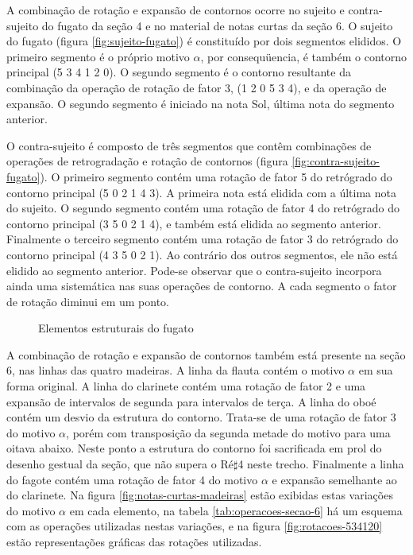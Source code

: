A combinação de rotação e expansão de contornos ocorre no sujeito e
contra-sujeito do fugato da seção 4 e no material de notas curtas da
seção 6. O sujeito do fugato (figura \ref{fig:sujeito-fugato}) é
constituído por dois segmentos elididos. O primeiro segmento é o
próprio motivo $\alpha$, por consequüencia, é também o contorno
principal (5 3 4 1 2 0). O segundo segmento é o contorno resultante da
combinação da operação de rotação de fator 3, (1 2 0 5 3 4), e da
operação de expansão. O segundo segmento é iniciado na nota Sol,
última nota do segmento anterior.

O contra-sujeito é composto de três segmentos que contêm combinações
de operações de retrogradação e rotação de contornos (figura
\ref{fig:contra-sujeito-fugato}). O primeiro segmento contém uma
rotação de fator 5 do retrógrado do contorno principal (5 0 2 1 4
3). A primeira nota está elidida com a última nota do sujeito. O
segundo segmento contém uma rotação de fator 4 do retrógrado do
contorno principal (3 5 0 2 1 4), e também está elidida ao segmento
anterior. Finalmente o terceiro segmento contém uma rotação de fator 3
do retrógrado do contorno principal (4 3 5 0 2 1). Ao contrário dos
outros segmentos, ele não está elidido ao segmento anterior. Pode-se
observar que o contra-sujeito incorpora ainda uma sistemática nas suas
operações de contorno. A cada segmento o fator de rotação diminui em
um ponto.

\begin{figure}
  \centering

  \caption{Elementos estruturais do fugato}
  \label{fig:elementos-fugato}
\end{figure}

A combinação de rotação e expansão de contornos também está presente
na seção 6, nas linhas das quatro madeiras. A linha da flauta contém o
motivo $\alpha$ em sua forma original. A linha do clarinete contém uma
rotação de fator 2 e uma expansão de intervalos de segunda para
intervalos de terça. A linha do oboé contém um desvio da estrutura do
contorno. Trata-se de uma rotação de fator 3 do motivo $\alpha$, porém
com transposição da segunda metade do motivo para uma oitava
abaixo. Neste ponto a estrutura do contorno foi sacrificada em prol do
desenho gestual da seção, que não supera o Ré$\sharp$4 neste
trecho. Finalmente a linha do fagote contém uma rotação de fator 4 do
motivo $\alpha$ e expansão semelhante ao do clarinete. Na figura
\ref{fig:notas-curtas-madeiras} estão exibidas estas variações do
motivo $\alpha$ em cada elemento, na tabela
\ref{tab:operacoes-secao-6} há um esquema com as operações utilizadas
nestas variações, e na figura \ref{fig:rotacoes-534120} estão
representações gráficas das rotações utilizadas.

